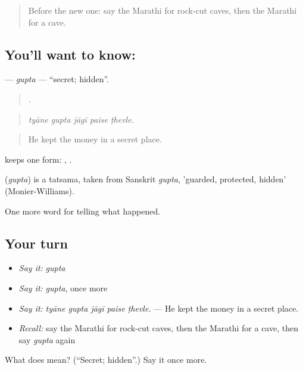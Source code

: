 \begin{quote}
Before the new one: say the Marathi for rock-cut caves, then the Marathi for a cave.
\end{quote}

\subsection*{You'll want to know: }
\textbf{} — \emph{gupta} — \textquotedblleft{}secret; hidden\textquotedblright{}.

\begin{quote}
    .
\end{quote}

\begin{quote}
\emph{tyāne gupta jāgī paise ṭhevle.}
\end{quote}

\begin{quote}
He kept the money in a secret place.
\end{quote}

 keeps one form:  ,  .

\begin{cousinweb}
\textbf{} (\emph{gupta}) is a tatsama, taken from Sanskrit \emph{gupta}, 'guarded, protected, hidden' (Monier-Williams).
\end{cousinweb}

\begin{grammarlens}[title={What you've built}]
One more word for telling what happened.
\end{grammarlens}

\subsection*{Your turn}
\begin{itemize}
\raggedright
  \item \emph{Say it:} \emph{gupta}
  \item \emph{Say it:} \emph{gupta}, once more
  \item \emph{Say it:} \emph{tyāne gupta jāgī paise ṭhevle.} — He kept the money in a secret place.
  \item \emph{Recall:} say the Marathi for rock-cut caves, then the Marathi for a cave, then say \emph{gupta} again
\end{itemize}

\begin{tcolorbox}[breakable,colback=teal!4,colframe=teal!35!black,title={Before you move on}]
What does  mean? (\textquotedblleft{}Secret; hidden\textquotedblright{}.) Say it once more.
\end{tcolorbox}
